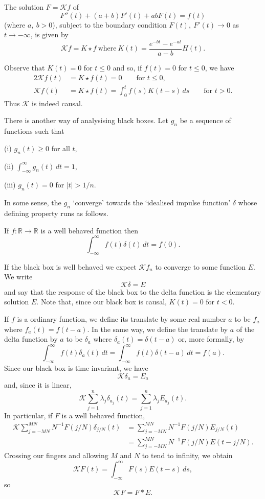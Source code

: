 \begin{lemma}\label{Lemma, big star}
The solution $F={\mathcal K}f$ of
\begin{equation*}
\tag*{$\bigstar$}
F''(t)+(a+b)F'(t)+ab F(t)=f(t)
\end{equation*}
(where $a,\ b>0$), subject to the boundary condition
$F(t),\ F'(t)\rightarrow 0$ as $t\rightarrow -\infty$,
is given by
\[{\mathcal K}f=K\star f
\ \text{where}\ K(t)=\frac{e^{-bt}-e^{-at}}{a-b}H(t).\]
\end{lemma}

Observe that $K(t)=0$ for $t\leq 0$ and so, if $f(t)=0$
for $t\leq 0$, we have
\begin{alignat*}{2}
{\mathcal K}f(t)&=K\star f(t)=0\qquad\text{for $t\leq 0$},\\
{\mathcal K}f(t)&=K\star f(t)=\int_{0}^{t}f(s)K(t-s)\,ds
\qquad\text{for $t>0$}.
\end{alignat*}
Thus ${\mathcal K}$ is indeed causal.

There is another way of analysising black boxes. Let
$g_{n}$ be a sequence of functions such that

(i) $g_{n}(t)\geq 0$ for all $t$,

(ii) ${\displaystyle \int_{-\infty}^{\infty}g_{n}(t)\,dt=1}$,

(iii) $g_{n}(t)=0$ for $|t|>1/n$.

\noindent In some sense, the $g_{n}$ `converge' towards
the `idealised impulse function' $\delta$ whose
defining property runs as follows.
\begin{definition} If $f:{\mathbb R}\rightarrow{\mathbb R}$
is a well behaved function then
\[\int_{-\infty}^{\infty}f(t)\delta(t)\,dt=f(0).\]
\end{definition}
If the black box is well behaved we expect ${\mathcal K}f_{n}$
to converge to some function $E$. We write
\[{\mathcal K}\delta=E\]
and say that the response of the black box to the delta
function is the elementary solution $E$. Note that,
since our black box is causal, $K(t)=0$ for $t<0$.

If $f$ is a ordinary function, we define its translate
by some real number $a$ to be $f_{a}$ where
$f_{a}(t)=f(t-a)$. In the same way, we define the
translate by $a$ of the delta function by $a$ to be
$\delta_{a}$ where $\delta_{a}(t)=\delta(t-a)$ or,
more formally, by
\[\int_{-\infty}^{\infty}f(t)\delta_{a}(t)\,dt=
\int_{-\infty}^{\infty}f(t)\delta(t-a)\,dt=f(a).\]
Since our black box is time invariant, we have
\[{\mathcal K}\delta_{a}=E_{a}\]
and, since it is linear,
\[{\mathcal K}\sum_{j=1}^{n}\lambda_{j}\delta_{a_{j}}(t)=
\sum_{j=1}^{n}\lambda_{j}E_{a_{j}}(t).\]
In particular, if $F$ is a well behaved function,
\begin{align*}
{\mathcal K}\sum_{j=-MN}^{MN}N^{-1}F(j/N)\delta_{j/N}(t)&=
\sum_{j=-MN}^{MN}N^{-1}F(j/N)E_{j/N}(t)\\
&=\sum_{j=-MN}^{MN}N^{-1}F(j/N)E(t-j/N).
\end{align*}
Crossing our fingers and allowing $M$ and $N$ to tend
to infinity, we obtain
\[{\mathcal K}F(t)=\int_{-\infty}^{\infty}F(s)E(t-s)\,ds,\]
so
\[{\mathcal K}F=F*E.\]

